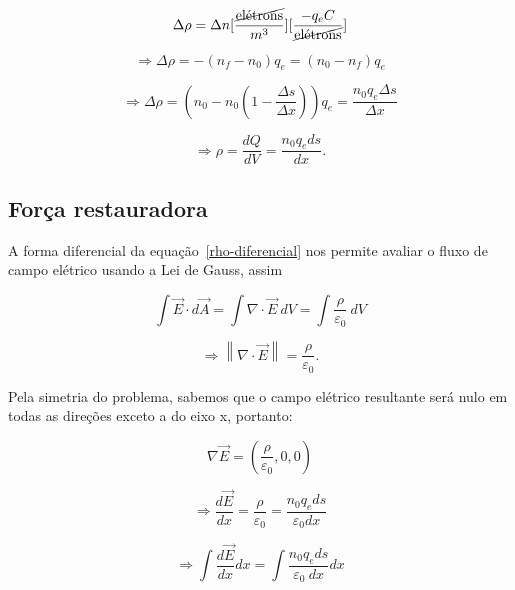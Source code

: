 \documentclass[
	article,
	11pt,
	oneside,
	a4paper,
	english,
	brazil,
	sumario=tradicional
	]{abntex2}
\newcommand{\norm}[1]{\left\lVert#1\right\rVert}
\begin{document}
\begin{equation}
  \Delta\rho = \Delta n [\frac{\cancel{\textrm{elétrons}}}{m^3}][\frac{- q_e C}{\cancel{\textrm{elétrons}}}]
\end{equation}

\begin{equation}
  \Rightarrow \Delta\rho = - (n_f - n_0) q_e = (n_0 - n_f) q_e
\end{equation}

\begin{equation}
  \Rightarrow \Delta\rho = (n_0 - n_0(1 - \frac{\Delta s}{\Delta x}))q_e = \frac{n_0 q_e \Delta s}{\Delta x}
\end{equation}

\begin{equation} \label{rho-diferencial}
  \Rightarrow \rho = \frac{dQ}{dV} = \frac{n_0 q_e ds}{dx}.
\end{equation}

\subsection{Força restauradora}\label{forca}

A forma diferencial da equação~\ref{rho-diferencial} nos permite avaliar o fluxo de campo elétrico usando a Lei de Gauss, assim

\begin{equation}
  \int \vec{E} \cdot d\vec{A} = \int \nabla \cdot \vec{E}~dV = \int \frac{\rho}{\varepsilon _0}~dV
\end{equation}

\begin{equation}
  \Rightarrow  \norm{\nabla \cdot \vec{E}} = \frac{\rho}{\varepsilon _0}.
\end{equation}

\noindent Pela simetria do problema, sabemos que o campo elétrico resultante será nulo em todas as direções exceto a do eixo x, portanto:

\begin{equation}
  \nabla \vec{E} = \left(\frac{\rho}{\varepsilon _0}, 0, 0\right)
\end{equation}

\begin{equation}
  \Rightarrow \frac{d\vec{E}}{dx} = \frac{\rho}{\varepsilon _0} = \frac{n_0 q_e ds}{\varepsilon _0 dx}
\end{equation}

\begin{equation}
  \Rightarrow \int \frac{d\vec{E}}{dx} dx = \int \frac{n_0 q_e ds}{\varepsilon _0~dx} dx
\end{equation}
\end{document}

